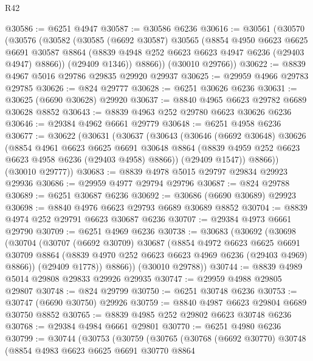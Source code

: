 \begin{lexlean}{R42}
\begin{coremodule}
{@30586 := @6251 @4947
@30587 := @30586 @6236
@30616 := @30561
    (@30570
      (@30576
        (@30582
          (@30585
            (@6692 @30587)
            @30565
            (@8854
              @4950
              @6623
              @6625
              @6691
              @30587
              @8864
              (@8839 @4948 @252 @6623 @6623 @4947 @6236 (@29403 @4947) @8866))
            (@29409 @1346))
          @8866))
      (@30010 @29766))
@30622 := @8839 @4967 @5016 @29786 @29835 @29920 @29937
@30625 := @29959 @4966 @29783 @29785
@30626 := @824 @29777
@30628 := @6251 @30626 @6236
@30631 := @30625 (@6690 @30628) @29920
@30637 := @8840 @4965 @6623 @29782 @6689 @30628 @8852
@30643 := @8839 @4963 @252 @29780 @6623 @30626 @6236
@30646 := @29384 @4962 @6661 @29779
@30648 := @6251 @4958 @6236
@30677 := @30622
    (@30631
      (@30637
        (@30643
          (@30646
            (@6692 @30648)
            @30626
            (@8854
              @4961
              @6623
              @6625
              @6691
              @30648
              @8864
              (@8839 @4959 @252 @6623 @6623 @4958 @6236 (@29403 @4958) @8866))
            (@29409 @1547))
          @8866))
      (@30010 @29777))
@30683 := @8839 @4978 @5015 @29797 @29834 @29923 @29936
@30686 := @29959 @4977 @29794 @29796
@30687 := @824 @29788
@30689 := @6251 @30687 @6236
@30692 := @30686 (@6690 @30689) @29923
@30698 := @8840 @4976 @6623 @29793 @6689 @30689 @8852
@30704 := @8839 @4974 @252 @29791 @6623 @30687 @6236
@30707 := @29384 @4973 @6661 @29790
@30709 := @6251 @4969 @6236
@30738 := @30683
    (@30692
      (@30698
        (@30704
          (@30707
            (@6692 @30709)
            @30687
            (@8854
              @4972
              @6623
              @6625
              @6691
              @30709
              @8864
              (@8839 @4970 @252 @6623 @6623 @4969 @6236 (@29403 @4969) @8866))
            (@29409 @1778))
          @8866))
      (@30010 @29788))
@30744 := @8839 @4989 @5014 @29808 @29833 @29926 @29935
@30747 := @29959 @4988 @29805 @29807
@30748 := @824 @29799
@30750 := @6251 @30748 @6236
@30753 := @30747 (@6690 @30750) @29926
@30759 := @8840 @4987 @6623 @29804 @6689 @30750 @8852
@30765 := @8839 @4985 @252 @29802 @6623 @30748 @6236
@30768 := @29384 @4984 @6661 @29801
@30770 := @6251 @4980 @6236
@30799 := @30744
    (@30753
      (@30759
        (@30765
          (@30768
            (@6692 @30770)
            @30748
            (@8854
              @4983
              @6623
              @6625
              @6691
              @30770
              @8864
}
\end{coremodule}
\end{lexlean}
